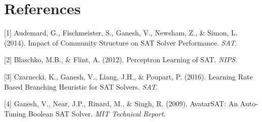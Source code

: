 \documentclass{article}
\begin{document}
\section*{References}
\label{references}

\small

[1] Audemard, G., Fischmeister, S., Ganesh, V., Newsham, Z., \& Simon, L. (2014).
Impact of Community Structure on SAT Solver Performance. \textit{SAT}.

[2] Blaschko, M.B., \& Flint, A. (2012).
Perceptron Learning of SAT. \textit{NIPS}.

[3] Czarnecki, K., Ganesh, V., Liang, J.H., \& Poupart, P. (2016).
Learning Rate Based Branching Heuristic for SAT Solvers. \textit{SAT}.

[4] Ganesh, V., Near, J.P., Rinard, M., \& Singh, R. (2009).
AvatarSAT: An Auto-Tuning Boolean SAT Solver. \textit{MIT Technical Report}.
\end{document}
